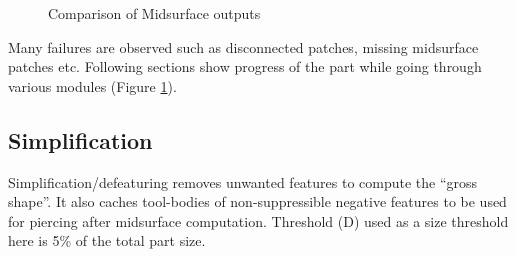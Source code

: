 \begin{figure}[!h]
\caption{Comparison of Midsurface outputs}
\label{fig:results:enlosurebenchmark}
\end{figure}
%

 Many failures are observed such as disconnected patches, missing midsurface patches etc. Following sections show progress of the part while going through various modules (Figure  \ref{fig:results:enlosurebenchmark}).

\subsection{Simplification} \label{sec:results:defeaturing}

Simplification/defeaturing removes unwanted features to compute the ``gross shape''. It also caches tool-bodies of non-suppressible negative features to be used for piercing after midsurface computation. 
Threshold (D) used as a size threshold here is 5\% of the total part size.

\def\myfigenlosuredefeaturecolumnwidth{0.95}
\def\myfigenlosuredefeatureTreecolumnwidth{0.75}

